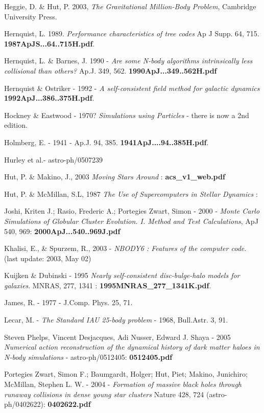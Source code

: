 Heggie, D. \& Hut, P. 2003, 
{\it The Gravitational Million-Body Problem}, 
Cambridge University Press.

Hernquist, L. 1989. {\it Performance characteristics of tree codes} Ap J Supp. 64, 715.
{\bf 1987ApJS...64..715H.pdf}.

Hernquist, L. \& Barnes, J. 1990 - 
{\it Are some N-body algorithms intrinsically less collisional than others?}
Ap.J. 349,  562. {\bf 1990ApJ...349..562H.pdf}

Hernquist \& Ostriker - 1992 - {\it A self-consistent field method for galactic dynamics}
{\bf 1992ApJ...386..375H.pdf}.

Hockney \& Eastwood - 1970? {\it Simulations using Particles} - there is now a 2nd edition.

Holmberg, E. - 1941 - Ap.J. 94, 385.
{\bf 1941ApJ....94..385H.pdf}.

Hurley et al.- astro-ph/0507239

Hut, P. \& Makino, J., 2003  {\it Moving Stars Around} :
{\bf acs\_v1\_web.pdf}

Hut, P. \& McMillan, S.L, 1987  {\it The Use of Supercomputers in Stellar Dynamics} :

Joshi, Kriten J.; Rasio, Frederic A.; Portegies Zwart, Simon - 2000 -
{\it Monte Carlo Simulations of Globular Cluster Evolution. I. Method and Test Calculations},
ApJ 540, 969: 
{\bf 2000ApJ...540..969J.pdf}

Khalisi, E., \& Spurzem, R., 2003 - {\it NBODY6 : Features of the computer code}.
(last update: 2003, May 02)

Kuijken \& Dubinski - 1995 {\it Nearly self-consistent disc-bulge-halo models for galaxies}.
MNRAS, 277, 1341 : {\bf 1995MNRAS\_277\_1341K.pdf}.

James, R. - 1977 -  J.Comp. Phys. 25, 71.

Lecar, M. - {\it The Standard IAU 25-body problem} - 1968, Bull.Astr. 3, 91. 

Steven Phelps, Vincent Desjacques, Adi Nusser, Edward J. Shaya - 2005
{\it Numerical action reconstruction of the dynamical history of dark matter haloes in N-body simulations} -
astro-ph/0512405:   {\bf 0512405.pdf}

Portegies Zwart, Simon F.; Baumgardt, Holger; Hut, Piet; Makino, Junichiro; McMillan, Stephen L. W. -
2004 - {\it Formation of massive black holes through runaway collisions in dense young star clusters}
Nature 428, 724 (astro-ph/0402622): {\bf 0402622.pdf}

